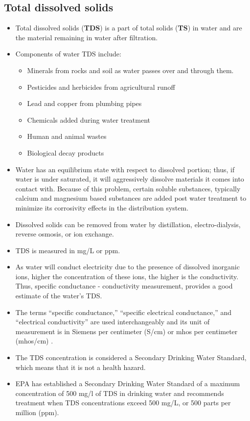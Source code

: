 \subsection{Total dissolved solids}
\begin{itemize}
\item Total dissolved solids (\textbf{TDS}) is a part of total solids (\textbf{TS}) in water and are the material remaining in water after filtration.
\item Components of water TDS include:
\begin{itemize}
\item Minerals from rocks and soil as water passes over and through them.
\item Pesticides and herbicides from agricultural runoff
\item Lead and copper from plumbing pipes
\item Chemicals added during water treatment
\item Human and animal wastes
\item Biological decay products
\end{itemize}
\item Water has an equilibrium state with respect to dissolved portion; thus, if water is under saturated, it will aggressively dissolve materials it comes into contact with. Because of this problem, certain soluble substances, typically calcium and magnesium based substances are added post water treatment to minimize its corrosivity effects in the distribution system.
\item Dissolved solids can be removed from water by distillation, electro-dialysis, reverse osmosis, or ion exchange.
\item TDS is measured in mg/L or ppm.  
\item As water will conduct electricity due to the presence of dissolved inorganic ions, higher the concentration of these ions, the higher is the conductivity. Thus, specific conductance  - conductivity measurement, provides a good estimate of the water's TDS.
\item The terms “specific conductance,” “specific electrical conductance,” and
“electrical conductivity” are used interchangeably and its unit of measurement is in Siemens per centimeter (S/cm) or mhos per centimeter (mhos/cm)  .
\item The TDS concentration is considered a Secondary Drinking Water Standard, which means that it is not a health hazard.
\item EPA has established a Secondary Drinking Water Standard of a maximum concentration of 500 mg/l of TDS in drinking water and  recommends treatment when TDS concentrations exceed 500 mg/L, or 500 parts per million (ppm). 
\end{itemize} 

